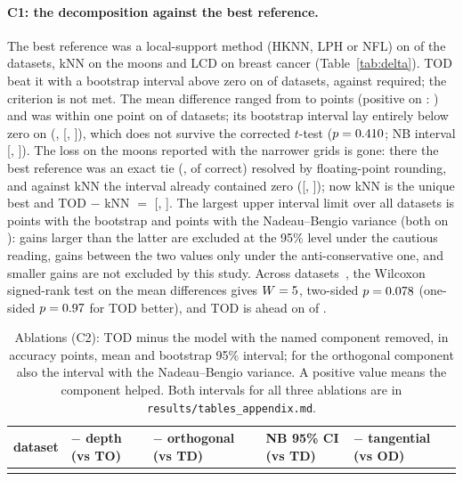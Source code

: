\documentclass[10pt,a4paper]{article}
\theoremstyle{plain}
\theoremstyle{definition}
\theoremstyle{remark}
\newcommand{\meth}[1]{\textsf{#1}}
\begin{document}
\paragraph{C1: the decomposition against the best reference.} The best reference was a local-support method (\meth{HKNN}, \meth{LPH} or \meth{NFL}) on \NBestRefHull{} of the \NDatasets{} datasets, \meth{kNN} on the moons and \meth{LCD} on breast cancer (Table~\ref{tab:delta}). \meth{TOD} beat it with a bootstrap interval above zero on \NSigWins{} of \NDatasets{} datasets, against \NRequired{} required; the criterion is not met. The mean difference ranged from \DeltaBestMin{} to \DeltaBestMax{} points (positive on \NDeltaPositive: \DeltaPositiveList) and was within one point on \NDeltaWithinOne{} of \NDatasets{} datasets; its bootstrap interval lay entirely below zero on \NSigLosses{} (\SigLossesList, \DeltaBestTwoDigits{} [\CiLoBestTwoDigits, \CiHiBestTwoDigits]), which does not survive the corrected $t$-test ($p=0.410$; NB interval [\NbLoBestTwoDigits, \NbHiBestTwoDigits]). The loss on the moons reported with the narrower grids is gone: there the best reference was an exact tie (\VtwoBestRefMoons, \VtwoTieCorrectMoons{} of \NTestTotalMoons{} correct) resolved by floating-point rounding, and against \meth{kNN} the interval already contained zero ([\VtwoDeltaLoMoons, \VtwoDeltaHiMoons]); now \meth{kNN} is the unique best and \meth{TOD} $-$ \meth{kNN} $=$ \DeltaBestTwoMoons{} [\CiLoBestTwoMoons, \CiHiBestTwoMoons]. The largest upper interval limit over all datasets is \CiHiBestMax{} points with the bootstrap and \CiHiBestMaxNb{} points with the Nadeau--Bengio variance (both on \CiHiBestMaxNbArg): gains larger than the latter are excluded at the 95\% level under the cautious reading, gains between the two values only under the anti-conservative one, and smaller gains are not excluded by this study. Across datasets~\citep{demsar2006}, the Wilcoxon signed-rank test on the \NDatasets{} mean differences gives $W=5$, two-sided $p=0.078$ (one-sided $p=0.97$ for \meth{TOD} better), and \meth{TOD} is ahead on \SignTestPos{} of \NDatasets.

\begin{table}[tb]
\centering\footnotesize\setlength{\tabcolsep}{3pt}
\begin{tabular}{lllll}
\toprule
dataset & $-$ depth (vs TO) & $-$ orthogonal (vs TD) & NB 95\% CI (vs TD) & $-$ tangential (vs OD)\\
\midrule
\\
\bottomrule
\end{tabular}
\caption{Ablations (C2): TOD minus the model with the named component removed, in accuracy points, mean and bootstrap 95\% interval; for the orthogonal component also the interval with the Nadeau--Bengio variance. A positive value means the component helped. Both intervals for all three ablations are in \texttt{results/tables\_appendix.md}.}
\label{tab:ablation}
\end{table}
\end{document}
